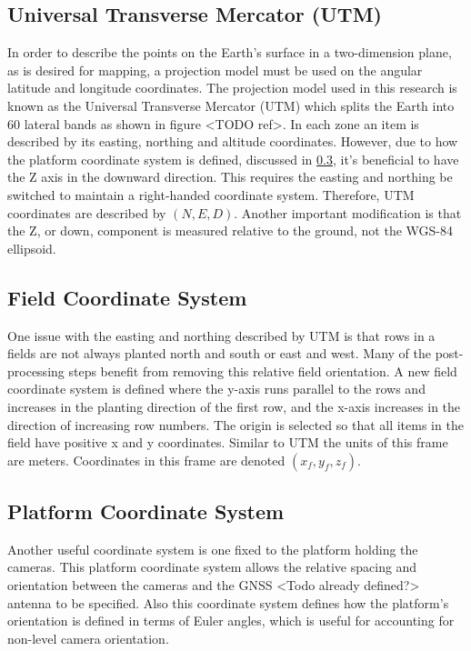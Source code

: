 \subsection{Universal Transverse Mercator (UTM)}

In order to describe the points on the Earth's surface in a two-dimension plane, as is desired for mapping, a projection model must be used on the angular latitude and longitude coordinates.  The projection model used in this research is known as the Universal Transverse Mercator (UTM) which splits the Earth into 60 lateral bands as shown in figure <TODO ref>.  In each zone an item is described by its easting, northing and altitude coordinates.  However, due to how the platform coordinate system is defined, discussed in \ref{platform_coordinate_system}, it's beneficial to have the Z axis in the downward direction.  This requires the easting and northing be switched to maintain a right-handed coordinate system. Therefore, UTM coordinates are described by $(N,E,D)$.  Another important modification is that the Z, or down, component is measured relative to the ground, not the WGS-84 ellipsoid. 

\subsection{Field Coordinate System}

One issue with the easting and northing described by UTM is that rows in a fields are not always planted north and south or east and west.  Many of the post-processing steps benefit from removing this relative field orientation. A new field coordinate system is defined where the y-axis runs parallel to the rows and increases in the planting direction of the first row, and the x-axis increases in the direction of increasing row numbers.  The origin is selected so that all items in the field have positive x and y coordinates.   Similar to UTM the units of this frame are meters.  Coordinates in this frame are denoted $(x_f,y_f,z_f)$.

\subsection{Platform Coordinate System}
\label{platform_coordinate_system}

Another useful coordinate system is one fixed to the platform holding the cameras.  This platform coordinate system allows the relative spacing and orientation between the cameras and the GNSS <Todo already defined?> antenna to be specified.   Also this coordinate system defines how the platform's orientation is defined in terms of Euler angles, which is useful for accounting for non-level camera orientation. 


